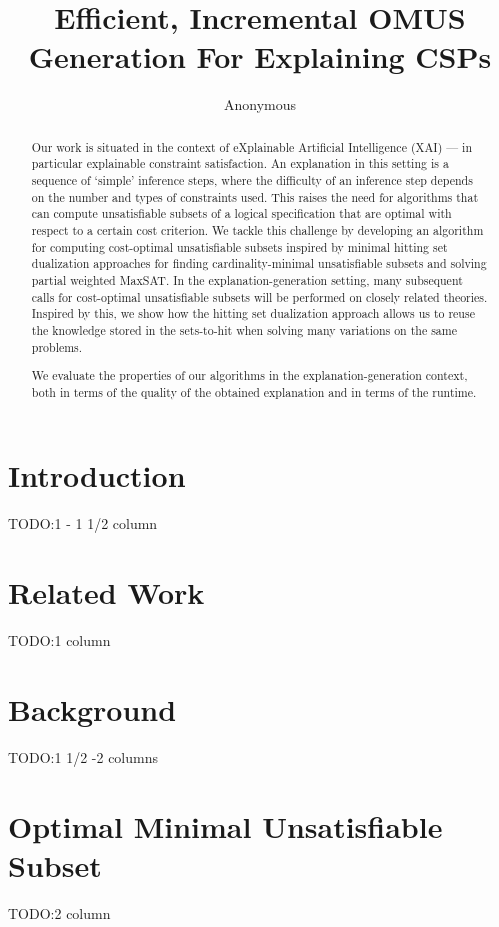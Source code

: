 \documentclass[letterpaper]{article} %
\title{Efficient, Incremental OMUS Generation For Explaining CSPs}
\author{Anonymous}
\newcommand\comment[1]{\marginpar{\tiny #1}}
\renewcommand\comment[1]{#1}
\newcommand{\todo}[1]{{\comment{\color{red}\textsc{TODO:}#1} }}
\begin{document}
\maketitle

\begin{abstract}
Our work is situated in the context of eXplainable Artificial Intelligence (XAI) --- in particular explainable constraint satisfaction.
An explanation in this setting is a sequence of `simple' inference steps, where the difficulty of an inference step depends on the number and types of constraints used.
This raises the need for algorithms that can compute unsatisfiable subsets of a logical specification that are optimal with respect to a certain cost criterion.
We tackle this challenge by developing an algorithm for computing cost-optimal unsatisfiable subsets inspired by minimal hitting set dualization approaches for finding cardinality-minimal unsatisfiable subsets and solving partial weighted MaxSAT.
In the explanation-generation setting, many subsequent calls for cost-optimal unsatisfiable subsets will be performed on closely related theories.
Inspired by this, we show how the hitting set dualization approach allows us to reuse the knowledge stored in the sets-to-hit when solving many variations on the same problems.

We evaluate the properties of our algorithms in the explanation-generation context, both in terms of the quality of the obtained explanation and in terms of the runtime.


\end{abstract}

\section{Introduction}
\todo{1 - 1 1/2 column}

\section{Related Work}\label{sec:related}
\todo{1 column}

\section{Background}\label{sec:backgr}
\todo{1 1/2 -2 columns}


\section{Optimal Minimal Unsatisfiable Subset}\label{sec:incremetnal}
\todo{2 column}

\end{document}
